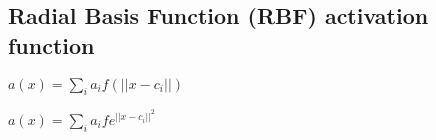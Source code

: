 
\subsection{Radial Basis Function (RBF) activation function}

\(a(x)=\sum_i a_i f(||x-c_i||)\)

\(a(x)=\sum_i a_i fe^{||x-c_i||^2}\)

